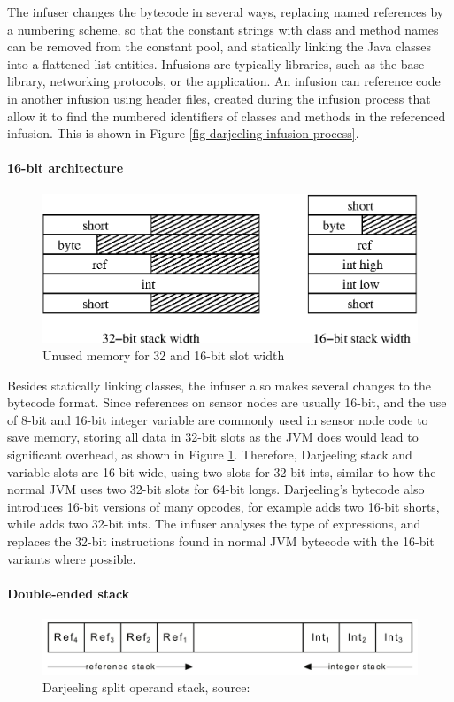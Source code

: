 The infuser changes the bytecode in several ways, replacing named references by a numbering scheme, so that the constant strings with class and method names can be removed from the constant pool, and statically linking the Java classes into a flattened list entities. Infusions are typically libraries, such as the  base library, networking protocols, or the application. An infusion can reference code in another infusion using header files, created during the infusion process that allow it to find the numbered identifiers of classes and methods in the referenced infusion. This is shown in Figure \ref{fig-darjeeling-infusion-process}.

\paragraph{16-bit architecture}
\begin{figure}
\centering
\includegraphics[width=0.6\linewidth]{32bit-vs-16bit-stack}
\caption{Unused memory for 32 and 16-bit slot width}
\label{fig-32bit-vs-16bit-stack}
\end{figure}

Besides statically linking classes, the infuser also makes several changes to the bytecode format. Since references on sensor nodes are usually 16-bit, and the use of 8-bit and 16-bit integer variable are commonly used in sensor node code to save memory, storing all data in 32-bit slots as the JVM does would lead to significant overhead, as shown in Figure \ref{fig-32bit-vs-16bit-stack}. Therefore, Darjeeling stack and variable slots are 16-bit wide, using two slots for 32-bit ints, similar to how the normal JVM uses two 32-bit slots for 64-bit longs. Darjeeling's bytecode also introduces 16-bit versions of many opcodes, for example  adds two 16-bit shorts, while  adds two 32-bit ints. The infuser analyses the type of expressions, and replaces the 32-bit instructions found in normal JVM bytecode with the 16-bit variants where possible.



\paragraph{Double-ended stack}
\begin{figure}
\centering
\includegraphics[width=0.6\linewidth]{darjeeling-split-stack}
\caption[Darjeeling split operand stack]{Darjeeling split operand stack, source: \cite{Brouwers:2009cj}}
\label{fig-darjeeling-split-stack}
\end{figure}

